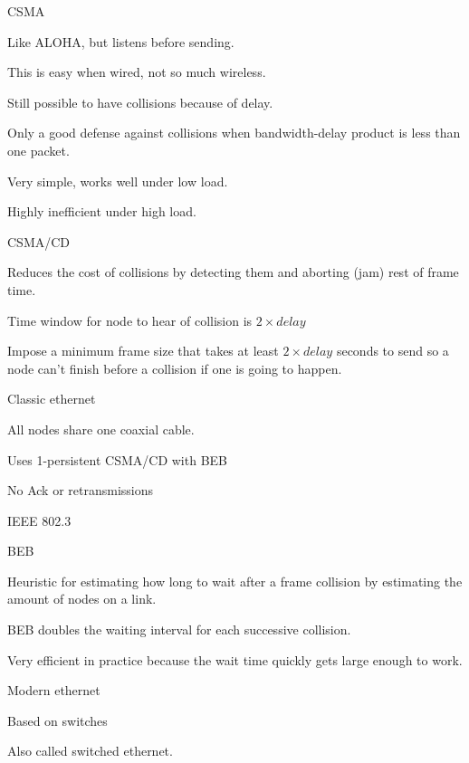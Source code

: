 \documentclass[main.tex]{subfiles}
\begin{document}
\begin{card}{CSMA}
\item Like ALOHA, but listens before sending.
\item This is easy when wired, not so much wireless.
\item Still possible to have collisions because of delay.
\item Only a good defense against collisions when bandwidth-delay product is less than one packet.
\item Very simple, works well under low load.
\item Highly inefficient under high load.
\end{card}

\begin{card}{CSMA/CD}
\item Reduces the cost of collisions by detecting them and aborting (jam) rest of frame time.
\item Time window for node to hear of collision is $2\times delay$
\item Impose a minimum frame size that takes at least $2\times delay$ seconds to send so a node can't finish before a collision if one is going to happen.
\end{card}

\begin{card}{Classic ethernet}
\item All nodes share one coaxial cable.
\item Uses 1-persistent CSMA/CD with BEB
\item No Ack or retransmissions
\item IEEE 802.3
\end{card}

\begin{card}{BEB}
\item Heuristic for estimating how long to wait after a frame collision by estimating the amount of nodes on a link.
\item BEB doubles the waiting interval for each successive collision.
\item Very efficient in practice because the wait time quickly gets large enough to work.
\end{card}

\begin{card}{Modern ethernet}
\item Based on switches
\item Also called switched ethernet.
\end{card}
\end{document}
